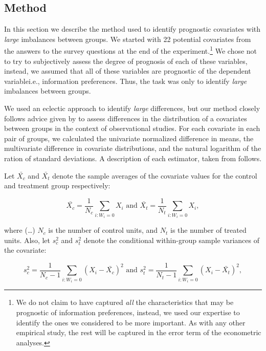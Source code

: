 %

\subsection{Method}

In this section we describe the method used to identify prognostic covariates with \emph{large} imbalances between groups. We started with 22 potential covariates from the answers to the survey questions at the end of the experiment.\footnote{We do not claim to have captured \emph{all} the characteristics that may be prognostic of information preferences, instead, we used our expertise to identify the ones we considered to be more important. As with any other empirical study, the rest will be captured in the error term of the econometric analyses.} We chose not to try to subjectively assess the degree of prognosis of each of these variables, instead, we assumed that all of these variables are prognostic of the dependent variable\textemdash i.e., information preferences. Thus, the task was only to identify \emph{large} imbalances between groups.

We used an eclectic approach to identify \emph{large} differences, but our method closely follows advice given by \citet{imbensCausalInferenceStatistics2015} to assess differences in the distribution of a covariates between groups in the context of observational studies. For each covariate in each pair of groups, we calculated the univariate normalized difference in means, the multivariate difference in covariate distributions, and the natural logarithm of the ration of standard deviations. A description of each estimator, taken from \citet{imbensCausalInferenceStatistics2015} follows.


\begin{displayquote}

Let $\bar{X_c}$ and $\bar{X_t}$ denote the sample averages of the covariate values for the control and treatment group respectively:

\begin{equation*}
  \bar{X_c}=\frac{1}{N_c} \sum_{i:W_i=0} X_i
  \text{  and  }
  \bar{X_t}=\frac{1}{N_t} \sum_{i:W_i=0} X_i,
\end{equation*}

where (\ldots) $N_c$ is the number of control units, and $N_t$ is the number of treated units. Also, let $s_c^2$ and $s_t^2$ denote the conditional within-group sample variances of the covariate:

\begin{equation*}
  s_c^2=\frac{1}{N_c-1} \sum_{i:W_i=0} (X_i-\bar{X_c})^2
  \text{  and  }
  s_t^2=\frac{1}{N_t-1} \sum_{i:W_i=0} (X_i-\bar{X_t})^2,
\end{equation*}

\end{displayquote}

